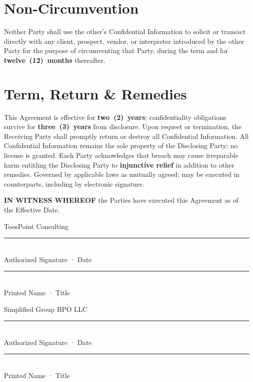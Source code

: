 \documentclass{toospoint}
\begin{document}
\section{Non-Circumvention}
\noindent Neither Party shall use the other's Confidential Information to solicit or
transact directly with any client, prospect, vendor, or interpreter introduced by
the other Party for the purpose of circumventing that Party, during the term and
for \textbf{twelve~(12)~months} thereafter.

\section{Term, Return \& Remedies}
\noindent This Agreement is effective for \textbf{two~(2)~years}; confidentiality
obligations survive for \textbf{three~(3)~years} from disclosure. Upon request or
termination, the Receiving Party shall promptly return or destroy all Confidential
Information. All Confidential Information remains the sole property of the
Disclosing Party; no license is granted. Each Party acknowledges that breach may
cause irreparable harm entitling the Disclosing Party to \textbf{injunctive
relief} in addition to other remedies. Governed by applicable laws as mutually
agreed; may be executed in counterparts, including by electronic signature.

\normalsize

\vspace{8pt}

\begin{center}
  {\sffamily\footnotesize\bfseries\color{TPDark}IN WITNESS WHEREOF}\enspace%
  {\sffamily\scriptsize\color{TPGray}the Parties have executed this Agreement as of the Effective Date.}
\end{center}

\vspace{4pt}

\noindent
\begin{minipage}[t]{0.46\textwidth}
  \sffamily\footnotesize
  {\color{TPGray}ToosPoint Consulting}\\[22pt]
  {\color{TPDark}\rule{\linewidth}{0.6pt}}\\[1pt]
  {\color{TPGray}Authorized Signature \; · \; Date}\\[14pt]
  {\color{TPBorder}\rule{\linewidth}{0.6pt}}\\[1pt]
  {\color{TPGray}Printed Name \; · \; Title}
\end{minipage}%
\hfill
\begin{minipage}[t]{0.46\textwidth}
  \sffamily\footnotesize
  {\color{TPGray}Simplified Group BPO LLC}\\[22pt]
  {\color{TPDark}\rule{\linewidth}{0.6pt}}\\[1pt]
  {\color{TPGray}Authorized Signature \; · \; Date}\\[14pt]
  {\color{TPBorder}\rule{\linewidth}{0.6pt}}\\[1pt]
  {\color{TPGray}Printed Name \; · \; Title}
\end{minipage}
\end{document}

